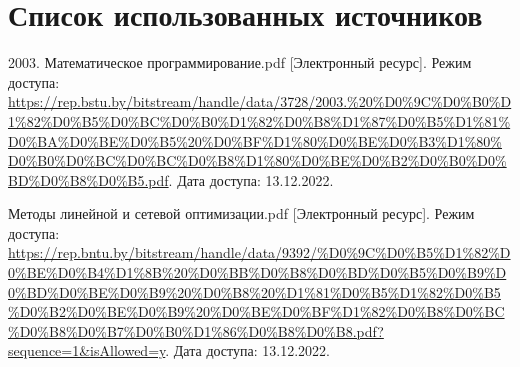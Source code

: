 
\begingroup
  \section*{Список использованных источников}

  \renewcommand{\addcontentsline}[3]{}%
  \renewcommand{\section}[2]{}%

  \begin{thebibliography}{}
    2003. Математическое программирование.pdf
    [Электронный ресурс].
    Режим доступа: \url{https://rep.bstu.by/bitstream/handle/data/3728/2003.%20%D0%9C%D0%B0%D1%82%D0%B5%D0%BC%D0%B0%D1%82%D0%B8%D1%87%D0%B5%D1%81%D0%BA%D0%BE%D0%B5%20%D0%BF%D1%80%D0%BE%D0%B3%D1%80%D0%B0%D0%BC%D0%BC%D0%B8%D1%80%D0%BE%D0%B2%D0%B0%D0%BD%D0%B8%D0%B5.pdf}.
    Дата доступа: 13.12.2022.

    Методы линейной и сетевой оптимизации.pdf
    [Электронный ресурс].
    Режим доступа: \url{https://rep.bntu.by/bitstream/handle/data/9392/%D0%9C%D0%B5%D1%82%D0%BE%D0%B4%D1%8B%20%D0%BB%D0%B8%D0%BD%D0%B5%D0%B9%D0%BD%D0%BE%D0%B9%20%D0%B8%20%D1%81%D0%B5%D1%82%D0%B5%D0%B2%D0%BE%D0%B9%20%D0%BE%D0%BF%D1%82%D0%B8%D0%BC%D0%B8%D0%B7%D0%B0%D1%86%D0%B8%D0%B8.pdf?sequence=1&isAllowed=y}.
    Дата доступа: 13.12.2022.
  \end{thebibliography}
\endgroup

\newpage

\begingroup
  \section*{Литература, чтобы писать в \TeX~(\LaTeX)}
  \addcontentsline{toc}{section}{Литература, чтобы писать в LaTeX}

  \renewcommand{\addcontentsline}[3]{}%
  \renewcommand{\section}[2]{}%

